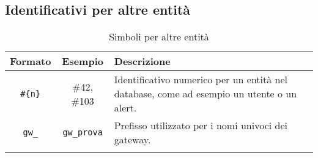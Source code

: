 \subsection{Identificativi per altre entità}

\begin{center}
	\begin{longtable}{|c|c|p{12cm}|}
	\hline
	\rowcolor{lighter-grayer}
	\textbf{Formato} & \textbf{Esempio} & \textbf{Descrizione} \\
	\hline
	\endfirsthead
	
	\verb!#{n}! & \#42, \#103  & Identificativo numerico per un entità nel database, come ad esempio un utente o un alert. \\
	\hline

	\verb!gw_! & \verb!gw_prova!  & Prefisso utilizzato per i nomi univoci dei gateway. \\
	\hline

	\caption{Simboli per altre entità}
	\end{longtable}
\end{center}